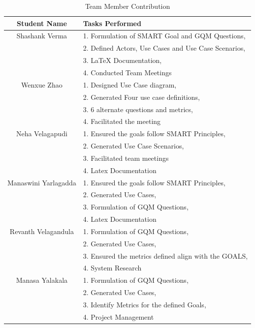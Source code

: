 \documentclass[letterpaper]{report}
\begin{document}
\begin {table}[H]
\begin{center}
\caption {Team Member Contribution} \label{tab:title}
 \begin{tabular}{|c|p{6cm}|}

    \hline
    \textbf{Student Name} & \textbf{Tasks Performed} \\
    \hline
    Shashank Verma & 1. Formulation of SMART Goal and GQM Questions, \\
    & 2. Defined Actors, Use Cases and Use Case Scenarios, \\
    & 3. LaTeX Documentation, \\
    & 4. Conducted Team Meetings \\
    \hline
    Wenxue Zhao & 1. Designed Use Case diagram, \\
    & 2. Generated Four use case definitions, \\
    & 3. 6 alternate questions and metrics, \\
    & 4. Facilitated the meeting \\
    \hline
    Neha Velagapudi & 
     1. Ensured the goals follow SMART Principles, \\
    & 2. Generated Use Case Scenarios, \\
    & 3. Facilitated team meetings \\
     & 4. Latex Documentation \\
    \hline
    Manaswini Yarlagadda & 
    1. Ensured the goals follow SMART Principles, \\
    & 2. Generated Use Cases, \\
    & 3. Formulation of GQM Questions, \\
     & 4. Latex Documentation \\
    \hline
    Revanth Velagandula &     1. Formulation of GQM Questions, \\
    & 2. Generated Use Cases, \\
    & 3. Ensured the metrics defined align with the GOALS, \\
     & 4. System Research \\
    \hline
    Manasa Yalakala &     1. Formulation of GQM Questions, \\
    & 2. Generated Use Cases, \\
    & 3. Identify Metrics for the defined Goals, \\
     & 4. Project Management \\
    \hline
\end{tabular} 
\end{center}
\end {table}
\end{document}
